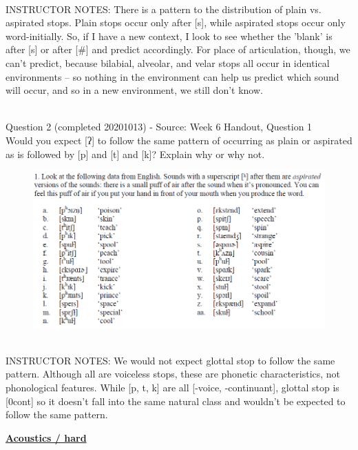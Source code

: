 \documentclass[12pt]{article}
\begin{document}
~\\
INSTRUCTOR NOTES: There is a pattern to the distribution of plain vs. aspirated stops. Plain stops occur only after [s], while aspirated stops occur only word-initially. So, if I have a new context, I look to see whether the 'blank' is after [s] or after [#] and predict accordingly. For place of articulation, though, we can't predict, because bilabial, alveolar, and velar stops all occur in identical environments -- so nothing in the environment can help us predict which sound will occur, and so in a new environment, we still don't know.


~\\

{\large Question 2} (completed 20201013) - Source: Week 6 Handout, Question 1\\

Would you expect [ʔ] to follow the same pattern of occurring as plain or aspirated as is followed by [p] and [t] and [k]? Explain why or why not.\\

\begin{figure}[H]
\includegraphics{../images/aspiration.png}
\end{figure}

~\\
INSTRUCTOR NOTES: We would not expect glottal stop to follow the same pattern. Although all are voiceless stops, these are phonetic characteristics, not phonological features. While [p, t, k] are all [-voice, -continuant], glottal stop is [0cont] so it doesn't fall into the same natural class and wouldn't be expected to follow the same pattern.


\newpage\textbf{\underline{\huge Acoustics / hard\\}}

~\\
\end{document}
